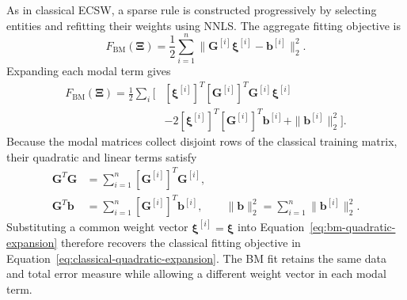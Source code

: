 \documentclass[a4paper,12pt]{article}
\newcommand{\vect}[1]{\boldsymbol{#1}}
\newcommand{\matr}[1]{\boldsymbol{#1}}
\begin{document}
As in classical ECSW, a sparse rule is constructed progressively by selecting entities and refitting their weights using NNLS. The aggregate fitting objective is
\begin{equation}
 F_{\mathrm{BM}}(\matr{\Xi})
 =\frac12\sum_{i=1}^n
       \|\matr{G}^{[i]}\vect{\xi}^{[i]}-\vect{b}^{[i]}\|_2^2.
 \label{eq:bm-global-fit}
\end{equation}
Expanding each modal term gives
\begin{equation}
 \begin{aligned}
 F_{\mathrm{BM}}(\matr{\Xi})
 =\frac12\sum_i\Big[&
  [\vect{\xi}^{[i]}]^T[\matr{G}^{[i]}]^T
     \matr{G}^{[i]}\vect{\xi}^{[i]}\\
  &-2[\vect{\xi}^{[i]}]^T[\matr{G}^{[i]}]^T\vect{b}^{[i]}
   +\|\vect{b}^{[i]}\|_2^2\Big].
 \end{aligned}
 \label{eq:bm-quadratic-expansion}
\end{equation}
Because the modal matrices collect disjoint rows of the classical training matrix, their quadratic and linear terms satisfy
\begin{equation}
 \begin{aligned}
 \matr{G}^T\matr{G}&=\sum_{i=1}^n[\matr{G}^{[i]}]^T\matr{G}^{[i]},\\
 \matr{G}^T\vect{b}&=\sum_{i=1}^n[\matr{G}^{[i]}]^T\vect{b}^{[i]},
 \qquad
 \|\vect{b}\|_2^2=\sum_{i=1}^n\|\vect{b}^{[i]}\|_2^2.
 \end{aligned}
 \label{eq:modal-gram-decomposition}
\end{equation}
Substituting a common weight vector $\vect{\xi}^{[i]}=\vect{\xi}$ into Equation~\eqref{eq:bm-quadratic-expansion} therefore recovers the classical fitting objective in Equation~\eqref{eq:classical-quadratic-expansion}. The BM fit retains the same data and total error measure while allowing a different weight vector in each modal term.
\end{document}
